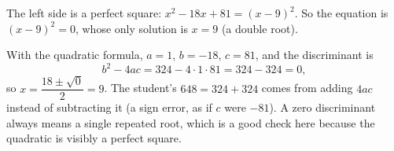 The left side is a perfect square: $x^2-18x+81=(x-9)^2$. So the equation is $(x-9)^2=0$, whose only solution is $x=\boxed{9}$ (a double root).

With the quadratic formula, $a=1$, $b=-18$, $c=81$, and the discriminant is
\[b^2-4ac=324-4\cdot1\cdot81=324-324=0,\]
so $x=\dfrac{18\pm\sqrt0}{2}=9$. The student's $648=324+324$ comes from adding $4ac$ instead of subtracting it (a sign error, as if $c$ were $-81$). A zero discriminant always means a single repeated root, which is a good check here because the quadratic is visibly a perfect square.
